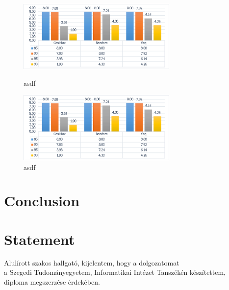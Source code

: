 \documentclass[12pt]{report}
\begin{document}
\begin{figure}
	\includegraphics[width=0.7\textwidth]{dia/stat1.eps}
	\caption{asdf}
	\includegraphics[width=0.7\textwidth]{dia/stat1.eps}
	\caption{asdf}
\end{figure}

\chapter{Conclusion}
\chapter*{Statement}



\noindent
Alulírott \makebox[4cm]{\dotfill} szakos hallgató, kijelentem, hogy a dolgozatomat \\
a Szegedi Tudományegyetem, Informatikai Intézet \makebox[4cm]{\dotfill} Tanszékén készítettem, \makebox[4cm]{\dotfill} diploma megszerzése érdekében.
\end{document}
